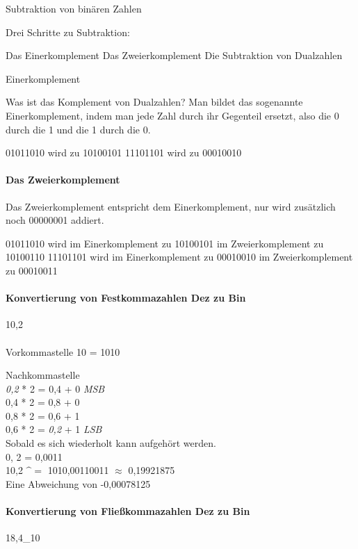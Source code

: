 \documentclass[12pt,twoside,a4paper]{article}
\begin{document}
Subtraktion von binären Zahlen

Drei Schritte zu Subtraktion:

Das Einerkomplement
Das Zweierkomplement
Die Subtraktion von Dualzahlen

Einerkomplement

Was ist das Komplement von Dualzahlen? Man bildet das sogenannte Einerkomplement, indem man jede Zahl durch ihr Gegenteil ersetzt, also die 0 durch die 1 und die 1 durch die 0.

01011010 wird zu 10100101
11101101 wird zu 00010010

\paragraph{Das Zweierkomplement}

Das Zweierkomplement entspricht dem Einerkomplement, nur wird zusätzlich noch 00000001 addiert.

01011010 wird im Einerkomplement zu 10100101 im Zweierkomplement zu 10100110
11101101 wird im Einerkomplement zu 00010010 im Zweierkomplement zu 00010011

\paragraph{Konvertierung von Festkommazahlen Dez zu Bin}

10,2 \\
\\

Vorkommastelle
10 = 1010

Nachkommastelle\\
\emph{0,2} * 2 = 0,4 + 0 \emph{MSB} \\ 
0,4 * 2 = 0,8 + 0\\
0,8 * 2 = 0,6 + 1\\
0,6 * 2 = \emph{0,2} + 1 \emph{LSB} \\ 

Sobald es sich wiederholt kann aufgehört werden.\\
0, 2 = 0,0011\\
10,2 $\^=$ 1010,00110011 $\approx$ 0,19921875
\\
\Longrightarrow Eine Abweichung von  -0,00078125
\\
\paragraph{Konvertierung von Fließkommazahlen Dez zu Bin}
18,4_{10}
\end{document}
